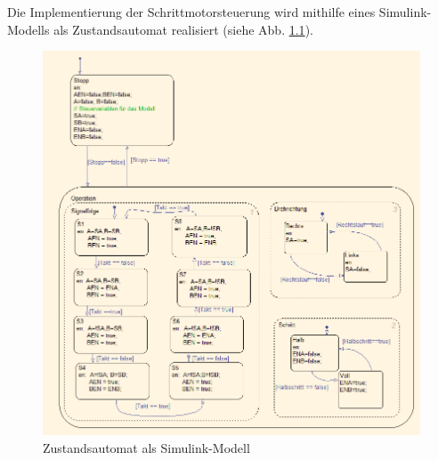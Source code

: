 \chapter{}\label{ex:aufg6}

Die Implementierung der Schrittmotorsteuerung wird mithilfe eines Simulink-Modells als Zustandsautomat realisiert (siehe Abb. \ref{fig:Aufg_6_Ansteuerung}).
\begin{figure}[htb]
	\includegraphics[width=\textwidth]{./Bilder/Aufg_6_Ansteuerung}
	\caption{Zustandsautomat als Simulink-Modell}
	\label{fig:Aufg_6_Ansteuerung}
\end{figure}
\clearpage